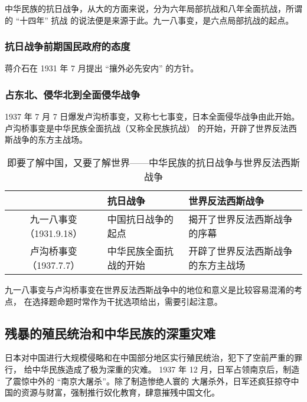 \documentclass[10pt, UTF8]{ctexbook} %
\begin{document}
\begin{remark}
    中华民族的抗日战争，从大的方面来说，分为六年局部抗战和八年全面抗战，所谓的 “十四年” 抗战
    的说法便是来源于此。九一八事变，是六点局部抗战的起点。
\end{remark}

\subsubsection{抗日战争前期国民政府的态度}

蒋介石在 1931 年 7 月提出 “攘外必先安内” 的方针。

\subsubsection{占东北、侵华北到全面侵华战争}

1937 年 7 月 7 日爆发卢沟桥事变，又称七七事变，日本全面侵华战争由此开始。卢沟桥事变是中华民族全面抗战（又称全民族抗战）
的开始，开辟了世界反法西斯战争的东方主战场。

\begin{table}[H]
    \centering
    \caption{即要了解中国，又要了解世界——中华民族的抗日战争与世界反法西斯战争}
    \begin{tabular}{c|p{}p{}}
        \hline
        & \textbf{抗日战争} & \textbf{世界反法西斯战争} \\
        \hline 
        九一八事变（1931.9.18） & 中国抗日战争的起点 & 揭开了世界反法西斯战争的序幕 \\ 
        \hline 
        卢沟桥事变（1937.7.7） & 中华民族全面抗战的开始 & 开辟了世界反法西斯战争的东方主战场 \\ 
        \hline 
    \end{tabular}
\end{table}
\begin{remark}
    九一八事变与卢沟桥事变在世界反法西斯战争中的地位和意义是比较容易混淆的考点，
    在选择题命题时常作为干扰选项给出，需要引起注意。
\end{remark}

\subsection{残暴的殖民统治和中华民族的深重灾难}

日本对中国进行大规模侵略和在中国部分地区实行殖民统治，犯下了空前严重的罪行，
给中华民族造成了极为深重的灾难。
1937 年 12 月，日军占领南京后，制造了震惊中外的 “南京大屠杀”。除了制造惨绝人寰的
大屠杀外，日军还疯狂掠夺中国的资源与财富，强制推行奴化教育，肆意摧残中国文化。
\end{document}
